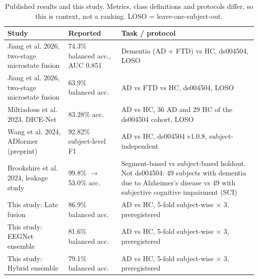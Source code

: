 \begin{table}[!t]
\centering
\footnotesize
\caption{Published results and this study. Metrics, class definitions and protocols differ, so this is context, not a ranking. LOSO = leave-one-subject-out.}
\label{tab:table3_literature}
\begin{tabular}{p{6.2cm}p{3.2cm}p{6.2cm}}
\toprule
Study & Reported & Task / protocol \\
\midrule
Jiang et al. 2026, two-stage microstate fusion & 74.3\% balanced acc., AUC 0.851 & Dementia (AD + FTD) vs HC, ds004504, LOSO \\
Jiang et al. 2026, two-stage microstate fusion & 63.9\% balanced acc. & AD vs FTD vs HC, ds004504, LOSO \\
Miltiadous et al. 2023, DICE-Net & 83.28\% acc. & AD vs HC, 36 AD and 29 HC of the ds004504 cohort, LOSO \\
Wang et al. 2024, ADformer (preprint) & 92.82\% subject-level F1 & AD vs HC, ds004504 v1.0.8, subject-independent \\
Brookshire et al. 2024, leakage study & 99.8\% $\rightarrow$ 53.0\% acc. & Segment-based vs subject-based holdout. Not ds004504: 49 subjects with dementia due to Alzheimer's disease vs 49 with subjective cognitive impairment (SCI) \\
This study: Late fusion & 86.9\% balanced acc. & AD vs HC, 5-fold subject-wise $\times$ 3, preregistered \\
This study: EEGNet ensemble & 81.6\% balanced acc. & AD vs HC, 5-fold subject-wise $\times$ 3, preregistered \\
This study: Hybrid ensemble & 79.1\% balanced acc. & AD vs HC, 5-fold subject-wise $\times$ 3, preregistered \\
\bottomrule
\end{tabular}
\end{table}

